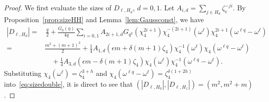 \documentclass[10pt]{amsart}
\theoremstyle{definition}
\begin{document}
\begin{proof}
We first evaluate the sizes of $D_{\ell,H_d}$, $d=0,1$. Let $A_{i,d}=\sum_{j\in H_d}\zeta_e^{-ji}$. By Proposition~\ref{prop:sizeHH} and Lemma~\ref{lem:Gaussconst}, we have
\begin{align}\label{eq:sizedouble}
|D_{\ell,H_d}|=&\,\frac{q}{2}+\frac{G_q(\eta)}{4q}\sum_{i=0,1} A_{2i+1,d} G_{q^2}(\chi_4^{2i+1})\chi_4^{-(2i+1)}(\omega^{\ell})\chi_4^{2i+1}(\omega^{\ell q}-\omega^{\ell})\\
=&\frac{m^2+(m+1)^2}{2}+\frac{1}{4}A_{1,d}(\epsilon m+\delta (m+1)\zeta_4)\chi_4^{-1}(\omega^{\ell})\chi_4(\omega^{\ell q}-\omega^{\ell})\nonumber\\
&\quad +\frac{1}{4}A_{3,d}(\epsilon m-\delta (m+1)\zeta_4)\chi_4(\omega^{\ell})\chi_4^{-1}(\omega^{\ell q}-\omega^{\ell}).\nonumber
\end{align}
Substituting $\chi_4(\omega^{\ell})=\zeta_4^{3+h}$ and $\chi_4(\omega^{\ell q}-\omega^{\ell})=\zeta_4^{\delta (1+2h)}$ into~\eqref{eq:sizedouble}, it is direct to see that $(|D_{\ell,H_0}|,|D_{\ell,H_1}|)=(m^2,m^2+m)$.


\end{proof}
\end{document}
